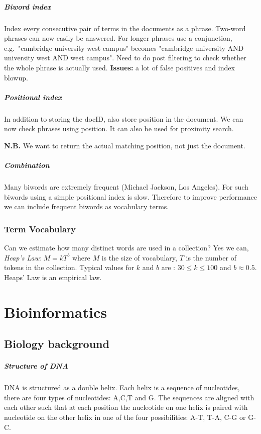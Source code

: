 \documentclass[a5paper]{report}
\newcommand\nb{\par\nobreak\smallskip\textbf{N.B. }}
\begin{document}
\paragraph{Biword index}
Index every consecutive pair of terms in the documents as a phrase.
Two-word phrases can now easily be answered.
For longer phrases use a conjunction, e.g.\ "cambridge university west campus" becomes "cambridge university AND university west AND west campus".
Need to do post filtering to check whether the whole phrase is actually used. \textbf{Issues:} a lot of false positives and index blowup.
\paragraph{Positional index}
In addition to storing the docID, also store position in the document.
We can now check phrases using position.
It can also be used for proximity search.
\nb We want to return the actual matching position, not just the document.
\paragraph{Combination}
Many biwords are extremely frequent (Michael Jackson, Los Angeles).
For such biwords using a simple positional index is slow.
Therefore to improve performance we can include frequent biwords as vocabulary terms.

\subsection{Term Vocabulary}
Can we estimate how many distinct words are used in a collection?
Yes we can, \emph{Heap's Law}: $M = kT^b$ where $M$ is the size of vocabulary, $T$ is the number of tokens in the collection.
Typical values for $k$ and $b$ are : $30\leq k\leq 100$ and $b \approx 0.5$.
Heaps' Law is an empirical law.



\chapter{Bioinformatics}
\section{Biology background}
\paragraph{Structure of DNA}
DNA is structured as a double helix.
Each helix is a sequence of nucleotides, there are four types of nucleotides: A,C,T and G.
The sequences are aligned with each other such that at each position the nucleotide on one helix is paired with nucleotide on the other helix in one of the four possibilities: A-T, T-A, C-G or G-C.
\end{document}
